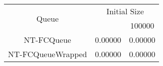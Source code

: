 \begin{tabular}{|c|c|c|}
\hline
\multirow{2}{*}{Queue} & \multicolumn{2}{c|}{Initial Size}\\\cline{2-3}& \qquad 10000 \qquad\quad & 100000\\
\hline
\hline
NT-FCQueue & 0.00000 & 0.00000\\
NT-FCQueueWrapped & 0.00000 & 0.00000\\
\hline\end{tabular}

